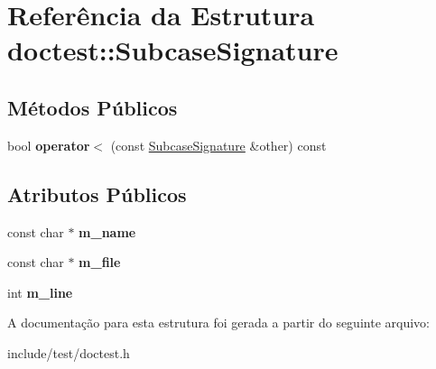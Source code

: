 \hypertarget{structdoctest_1_1SubcaseSignature}{}\section{Referência da Estrutura doctest\+:\+:Subcase\+Signature}
\label{structdoctest_1_1SubcaseSignature}
\subsection*{Métodos Públicos}
\begin{DoxyCompactItemize}
\item 
\mbox{\label{structdoctest_1_1SubcaseSignature_a07364f9dddf615f51e15f09b994d4bef}} 
bool {\bfseries operator$<$} (const \hyperlink{structdoctest_1_1SubcaseSignature}{Subcase\+Signature} \&other) const
\end{DoxyCompactItemize}
\subsection*{Atributos Públicos}
\begin{DoxyCompactItemize}
\item 
\mbox{\label{structdoctest_1_1SubcaseSignature_a1d926e49b4fe9d29b3e3d736a1b3dc05}} 
const char $\ast$ {\bfseries m\+\_\+name}
\item 
\mbox{\label{structdoctest_1_1SubcaseSignature_adc680b4597c89fb81ae8fed7fc41414d}} 
const char $\ast$ {\bfseries m\+\_\+file}
\item 
\mbox{\label{structdoctest_1_1SubcaseSignature_a73fb5432d0f8b82ffbe262b86af5c643}} 
int {\bfseries m\+\_\+line}
\end{DoxyCompactItemize}


A documentação para esta estrutura foi gerada a partir do seguinte arquivo\+:\begin{DoxyCompactItemize}
\item 
include/test/doctest.\+h\end{DoxyCompactItemize}
